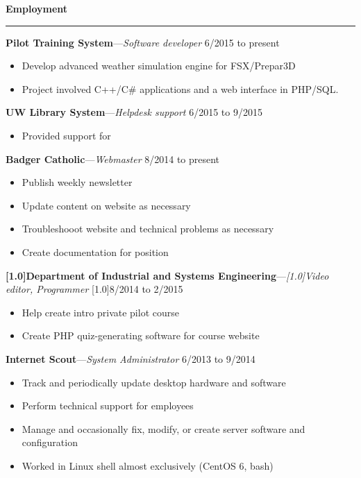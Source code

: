 \documentclass[12pt,letterpaper]{article}
\newenvironment{details}{
    \vspace{-.5em}
    \begin{itemize}
        \renewcommand \labelitemi{\labelitemiv}
        \setlength{\itemsep}{0pt}
        \setlength{\parskip}{-1pt}
        \setlength{\parsep}{0pt}
    }{
    \end{itemize}
    \vspace{-.5em}
}
\newcommand{\hr} {
    \vspace{-1em}
    \par\rule{\textwidth}{1pt}
    \vspace{-1.5em}
}
\newcommand{\ressection}[1] {
    \par{\large \textbf{#1}}
    \hr
}
\newenvironment{employment} {
    \setlength{\parskip}{0pt}
    \ressection{Employment}
}{
    \vspace{0.5em}
}
\newcommand{\employer}[3] {
    \vspace{3pt}
    {\par\textbf{#1}---\textit{#2} \hfill #3}
}
\begin{document}
\begin{employment} 

\employer{Pilot Training System}{Software developer}{6/2015 to present}
\begin{details}
    \item Develop advanced weather simulation engine for FSX/Prepar3D
    \item Project involved C++/C\# applications and a web interface in PHP/SQL.
\end{details}

\employer{UW Library System}{Helpdesk support}{6/2015 to 9/2015}
\begin{details}
    \item Provided support for 
\end{details}

\employer{Badger Catholic}{Webmaster}{8/2014 to present}
\begin{details}
    \item Publish weekly newsletter
    \item Update content on website as necessary
    \item Troubleshooot website and technical problems as necessary
    \item Create documentation for position
\end{details}

\employer{\scalebox{.8}[1.0]{Department of Industrial and Systems Engineering}}{\scalebox{.9}[1.0]{Video editor, Programmer}}{\scalebox{.9}[1.0]{8/2014 to 2/2015}}
\begin{details}
    \item Help create intro private pilot course
    \item Create PHP quiz-generating software for course website
\end{details}

\employer{Internet Scout}{System Administrator}{6/2013 to 9/2014}
\begin{details}
    \item Track and periodically update desktop hardware and software
    \item Perform technical support for employees
    \item Manage and occasionally fix, modify, or create server software and configuration
    \item Worked in Linux shell almost exclusively (CentOS 6, bash)
\end{details}



\end{employment}
\end{document}
